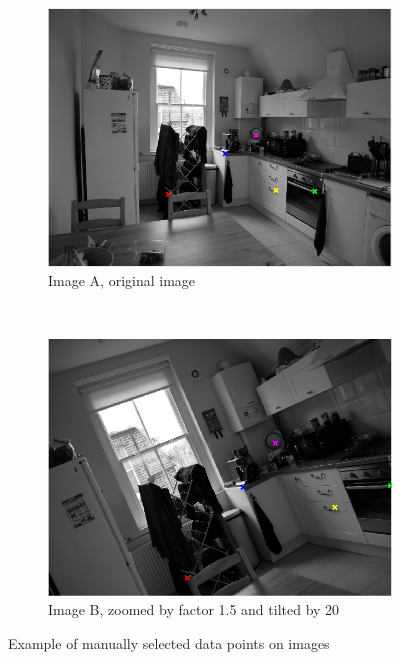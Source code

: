 \documentclass[a4paper, 10pt, conference]{ieeeconf}
\begin{document}
\begin{figure}[!ht]
  \captionsetup[subfigure]{position=b}
  \centering
    \begin{subfigure}{0.45\linewidth}
      \includegraphics[width=\textwidth]{pic/manualA}
      \caption{Image A, original image}
      \label{fig:manualA}
    \end{subfigure}
    ~
    \begin{subfigure}{0.45\linewidth}
      \includegraphics[width=\textwidth]{pic/manualB}
      \caption{Image B, zoomed by factor 1.5 and tilted by 20\degree}
      \label{fig:manualB}
    \end{subfigure}

	\caption{Example of manually selected data points on images}
  \label{fig:manual}
\end{figure}
\end{document}
